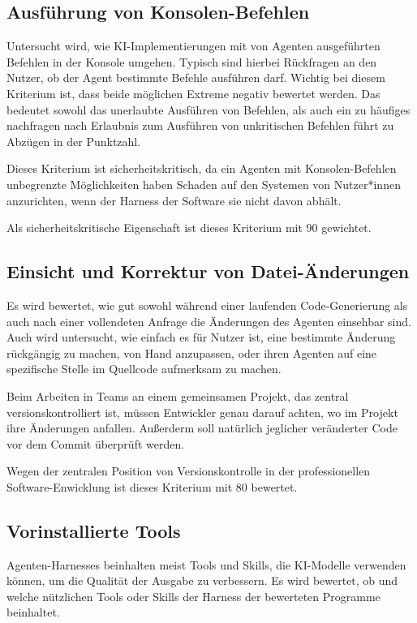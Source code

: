 \documentclass[ngerman]{seminarvorlage}
\begin{document}
\subsection{Ausführung von Konsolen-Befehlen}
Untersucht wird, wie KI-Implementierungen mit von Agenten ausgeführten Befehlen in der Konsole umgehen. Typisch sind hierbei Rückfragen an den Nutzer, ob der Agent bestimmte Befehle ausführen darf. Wichtig bei diesem Kriterium ist, dass beide möglichen Extreme negativ bewertet werden. Das bedeutet sowohl das unerlaubte Ausführen von Befehlen, als auch ein zu häufiges nachfragen nach Erlaubnis zum Ausführen von unkritischen Befehlen führt zu Abzügen in der Punktzahl.

Dieses Kriterium ist sicherheitskritisch, da ein Agenten mit Konsolen-Befehlen unbegrenzte Möglichkeiten haben Schaden auf den Systemen von Nutzer*innen anzurichten, wenn der Harness der Software sie nicht davon abhält.

Als sicherheitskritische Eigenschaft ist dieses Kriterium mit 90 gewichtet.

\subsection{Einsicht und Korrektur von Datei-Änderungen}
Es wird bewertet, wie gut sowohl während einer laufenden Code-Generierung als auch nach einer vollendeten Anfrage die Änderungen des Agenten einsehbar sind. Auch wird untersucht, wie einfach es für Nutzer ist, eine bestimmte Änderung rückgängig zu machen, von Hand anzupassen, oder ihren Agenten auf eine spezifische Stelle im Quellcode aufmerksam zu machen.

Beim Arbeiten in Teams an einem gemeinsamen Projekt, das zentral versionskontrolliert ist, müssen Entwickler genau darauf achten, wo im Projekt ihre Änderungen anfallen. Außerderm soll natürlich jeglicher veränderter Code vor dem Commit überprüft werden.

Wegen der zentralen Position von Versionskontrolle in der professionellen Software-Enwicklung ist dieses Kriterium mit 80 bewertet.

\subsection{Vorinstallierte Tools}
Agenten-Harnesses beinhalten meist Tools und Skills, die KI-Modelle verwenden können, um die Qualität der Ausgabe zu verbessern. Es wird bewertet, ob und welche nützlichen Tools oder Skills der Harness der bewerteten Programme beinhaltet.
\end{document}
